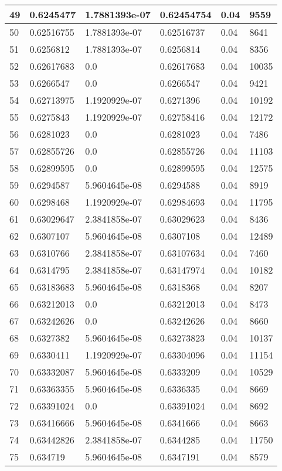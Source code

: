 \begin{longtable}{|l|l|l|l|l|l|}
49 & 0.6245477 & 1.7881393e-07 & 0.62454754 & 0.04 & 9559 \\ \hline 
50 & 0.62516755 & 1.7881393e-07 & 0.62516737 & 0.04 & 8641 \\ \hline 
51 & 0.6256812 & 1.7881393e-07 & 0.6256814 & 0.04 & 8356 \\ \hline 
52 & 0.62617683 & 0.0 & 0.62617683 & 0.04 & 10035 \\ \hline 
53 & 0.6266547 & 0.0 & 0.6266547 & 0.04 & 9421 \\ \hline 
54 & 0.62713975 & 1.1920929e-07 & 0.6271396 & 0.04 & 10192 \\ \hline 
55 & 0.6275843 & 1.1920929e-07 & 0.62758416 & 0.04 & 12172 \\ \hline 
56 & 0.6281023 & 0.0 & 0.6281023 & 0.04 & 7486 \\ \hline 
57 & 0.62855726 & 0.0 & 0.62855726 & 0.04 & 11103 \\ \hline 
58 & 0.62899595 & 0.0 & 0.62899595 & 0.04 & 12575 \\ \hline 
59 & 0.6294587 & 5.9604645e-08 & 0.6294588 & 0.04 & 8919 \\ \hline 
60 & 0.6298468 & 1.1920929e-07 & 0.62984693 & 0.04 & 11795 \\ \hline 
61 & 0.63029647 & 2.3841858e-07 & 0.63029623 & 0.04 & 8436 \\ \hline 
62 & 0.6307107 & 5.9604645e-08 & 0.6307108 & 0.04 & 12489 \\ \hline 
63 & 0.6310766 & 2.3841858e-07 & 0.63107634 & 0.04 & 7460 \\ \hline 
64 & 0.6314795 & 2.3841858e-07 & 0.63147974 & 0.04 & 10182 \\ \hline 
65 & 0.63183683 & 5.9604645e-08 & 0.6318368 & 0.04 & 8207 \\ \hline 
66 & 0.63212013 & 0.0 & 0.63212013 & 0.04 & 8473 \\ \hline 
67 & 0.63242626 & 0.0 & 0.63242626 & 0.04 & 8660 \\ \hline 
68 & 0.6327382 & 5.9604645e-08 & 0.63273823 & 0.04 & 10137 \\ \hline 
69 & 0.6330411 & 1.1920929e-07 & 0.63304096 & 0.04 & 11154 \\ \hline 
70 & 0.63332087 & 5.9604645e-08 & 0.6333209 & 0.04 & 10529 \\ \hline 
71 & 0.63363355 & 5.9604645e-08 & 0.6336335 & 0.04 & 8669 \\ \hline 
72 & 0.63391024 & 0.0 & 0.63391024 & 0.04 & 8692 \\ \hline 
73 & 0.63416666 & 5.9604645e-08 & 0.6341666 & 0.04 & 8663 \\ \hline 
74 & 0.63442826 & 2.3841858e-07 & 0.6344285 & 0.04 & 11750 \\ \hline 
75 & 0.634719 & 5.9604645e-08 & 0.6347191 & 0.04 & 8579 \\ \hline 
\end{longtable}